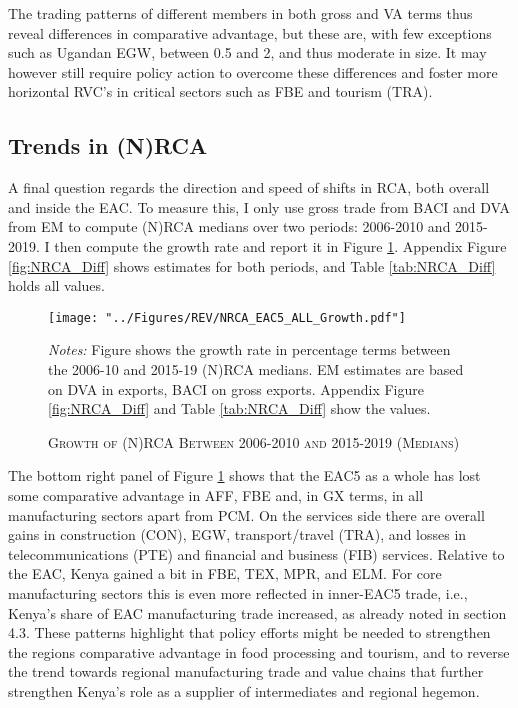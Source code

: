 \documentclass[a4paper]{article}
\begin{document}
The trading patterns of different members in both gross and VA terms thus reveal differences in comparative advantage, but these are, with few exceptions such as Ugandan EGW, between 0.5 and 2, and thus moderate in size. It may however still require policy action to overcome these differences and foster more horizontal RVC's in critical sectors such as FBE and tourism (TRA). 

\subsection{Trends in (N)RCA}

A final question regards the direction and speed of shifts in RCA, both overall and inside the EAC. To measure this, I only use gross trade from BACI and DVA from EM to compute (N)RCA medians over two periods: 2006-2010 and 2015-2019. I then compute the growth rate and report it in Figure \ref{fig:NRCA_GR}. Appendix Figure \ref{fig:NRCA_Diff} shows estimates for both periods, and Table \ref{tab:NRCA_Diff} holds all values. 

\begin{figure}[h!]
\centering
\caption{\label{fig:NRCA_GR}\textsc{Growth of (N)RCA Between 2006-2010 and 2015-2019 (Medians)}}
\texttt{[image: "../Figures/REV/NRCA\_EAC5\_ALL\_Growth.pdf"]} %
\raggedright
\scriptsize
\emph{Notes:} Figure shows the growth rate in percentage terms between the 2006-10 and 2015-19 (N)RCA medians. EM estimates are based on DVA in exports, BACI on gross exports. Appendix Figure \ref{fig:NRCA_Diff} and Table \ref{tab:NRCA_Diff} show the values. 
\end{figure}
\FloatBarrier

The bottom right panel of Figure \ref{fig:NRCA_GR} shows that the EAC5 as a whole has lost some comparative advantage in AFF, FBE and, in GX terms, in all manufacturing sectors apart from PCM. On the services side there are overall gains in construction (CON), EGW, transport/travel (TRA), and losses in telecommunications (PTE) and financial and business (FIB) services. Relative to the EAC, Kenya gained a bit in FBE, TEX, MPR, and ELM. For core manufacturing sectors this is even more reflected in inner-EAC5 trade, i.e., Kenya's share of EAC manufacturing trade increased, as already noted in section 4.3. These patterns highlight that policy efforts might be needed to strengthen the regions comparative advantage in food processing and tourism, and to reverse the trend towards regional manufacturing trade and value chains that further strengthen Kenya's role as a supplier of intermediates and regional hegemon. 
\end{document}
